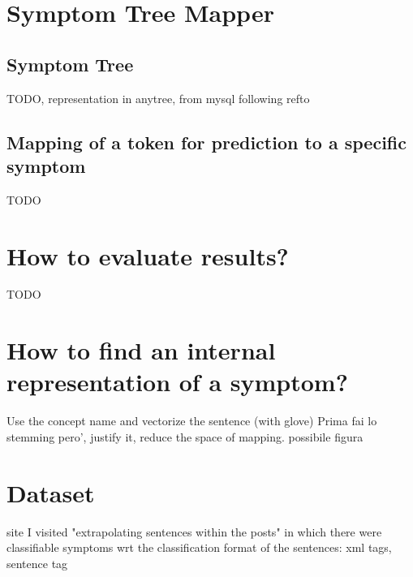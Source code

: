 \section{Symptom Tree Mapper}
\label{sec:symptom_tree_mapper}
\subsection{Symptom Tree}
TODO, representation in anytree, from mysql following refto

\subsection{Mapping of a token for prediction to a specific symptom}
TODO


\section{How to evaluate results?}
\label{sec:eval_results}
TODO


\section{How to find an internal representation of a symptom?}
Use the concept name and vectorize the sentence (with glove)
Prima fai lo stemming pero', justify it, reduce the space of mapping. possibile figura


\section{Dataset}
site I visited
"extrapolating sentences within the posts" in which there were classifiable symptoms wrt the classification
format of the sentences: xml tags, sentence tag